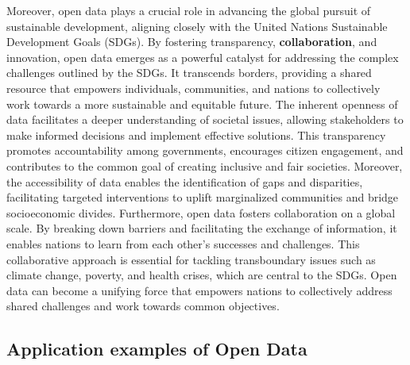 Moreover, open data plays a crucial role in advancing the global pursuit of sustainable development, aligning closely with the United Nations Sustainable Development Goals (SDGs)\cite{sdgs}. By fostering transparency, \textbf{collaboration}, and innovation, open data emerges as a powerful catalyst for addressing the complex challenges outlined by the SDGs. It transcends borders, providing a shared resource that empowers individuals, communities, and nations to collectively work towards a more sustainable and equitable future. The inherent openness of data facilitates a deeper understanding of societal issues, allowing stakeholders to make informed decisions and implement effective solutions. This transparency promotes accountability among governments, encourages citizen engagement, and contributes to the common goal of creating inclusive and fair societies. Moreover, the accessibility of data enables the identification of gaps and disparities, facilitating targeted interventions to uplift marginalized communities and bridge socioeconomic divides. Furthermore, open data fosters collaboration on a global scale. By breaking down barriers and facilitating the exchange of information, it enables nations to learn from each other's successes and challenges. This collaborative approach is essential for tackling transboundary issues such as climate change, poverty, and health crises, which are central to the SDGs. Open data can become a unifying force that empowers nations to collectively address shared challenges and work towards common objectives.

\subsection{Application examples of Open Data}

